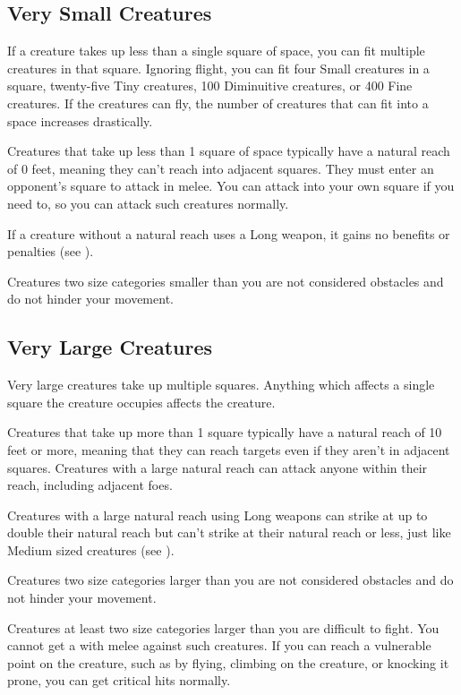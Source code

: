     \subsection{Very Small Creatures}
         If a creature takes up less than a single square of space, you can fit multiple creatures in that square.
        Ignoring flight, you can fit four Small creatures in a square, twenty-five Tiny creatures, 100 Diminuitive creatures, or 400 Fine creatures.
        If the creatures can fly, the number of creatures that can fit into a space increases drastically.

         Creatures that take up less than 1 square of space typically have a natural reach of 0 feet, meaning they can't reach into adjacent squares. They must enter an opponent's square to attack in melee. You can attack into your own square if you need to, so you can attack such creatures normally.

        If a creature without a natural reach uses a Long weapon, it gains no benefits or penalties (see ).

         Creatures two size categories smaller than you are not considered obstacles and do not hinder your movement.

    \subsection{Very Large Creatures}\label{Very Large Creatures}
         Very large creatures take up multiple squares. Anything which affects a single square the creature occupies affects the creature.

         Creatures that take up more than 1 square typically have a natural reach of 10 feet or more, meaning that they can reach targets even if they aren't in adjacent squares. Creatures with a large natural reach can attack anyone within their reach, including adjacent foes.

        Creatures with a large natural reach using Long weapons can strike at up to double their natural reach but can't strike at their natural reach or less, just like Medium sized creatures (see ).

         Creatures two size categories larger than you are not considered obstacles and do not hinder your movement.

         Creatures at least two size categories larger than you are difficult to fight.
        You cannot get a  with melee  against such creatures.
        If you can reach a vulnerable point on the creature, such as by flying, climbing on the creature, or knocking it prone, you can get critical hits normally.

